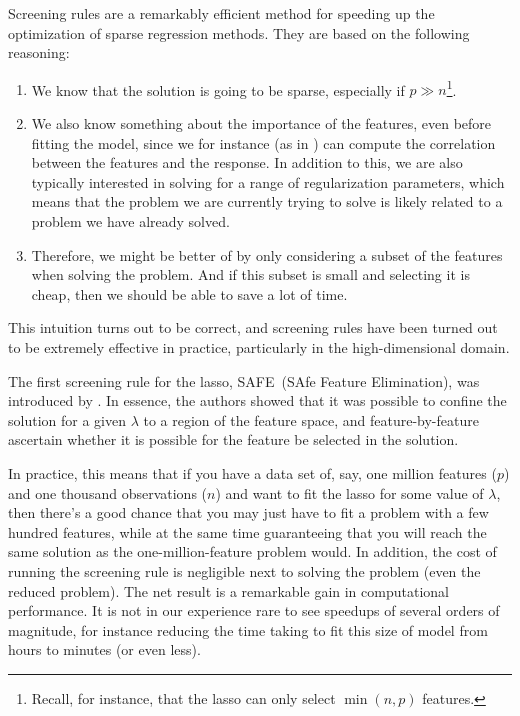 Screening rules are a remarkably efficient method for speeding up the optimization of sparse regression methods. They are based on the following reasoning:
\begin{enumerate}
  \item We know that the solution is going to be sparse, especially if \(p \gg n\)\footnote{Recall, for instance, that the lasso can only select \(\min(n, p)\) features.}.
  \item We also know something about the importance of the features, even before fitting the model, since we for instance (as in ) can compute the correlation between the features and the response. In addition to this, we are also typically interested in solving for a range of regularization parameters, which means that the problem we are currently trying to solve is likely related to a problem we have already solved.
  \item Therefore, we might be better of by only considering a subset of the features when solving the problem. And if this subset is small and selecting it is cheap, then we should be able to save a lot of time.
\end{enumerate}
This intuition turns out to be correct, and screening rules have been turned out to be extremely effective in practice, particularly in the high-dimensional domain.

The first screening rule for the lasso, SAFE~(SAfe Feature Elimination), was introduced by \textcite{elghaoui2010}. In essence, the authors showed that it was possible to confine the solution for a given \(\lambda\) to a region of the feature space, and feature-by-feature ascertain whether it is possible for the feature be selected in the solution.

In practice, this means that if you have a data set of, say, one million features (\(p\)) and one thousand observations (\(n\)) and want to fit the lasso for some value of \(\lambda\), then there's a good chance that you may just have to fit a problem with a few hundred features, while at the same time guaranteeing that you will reach the same solution as the one-million-feature problem would. In addition, the cost of running the screening rule is negligible next to solving the problem (even the reduced problem). The net result is a remarkable gain in computational performance. It is not in our experience rare to see speedups of several orders of magnitude, for instance reducing the time taking to fit this size of model from hours to minutes (or even less).

